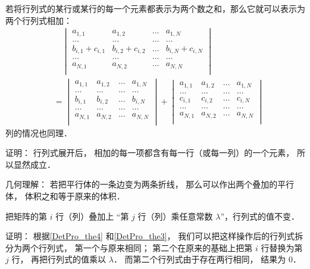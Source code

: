 \begin{theorem}{}\label{DetPro_the4}
若将行列式的某行或某行的每一个元素都表示为两个数之和，那么它就可以表示为两个行列式相加：
\begin{equation}\label{DetPro_eq1}
\begin{aligned}
&\quad\begin{vmatrix}
a_{1,1} & a_{1,2} & \dots & a_{1,N}\\
\dots & \dots & \dots & \dots\\
b_{i,1} + c_{i,1} & b_{i, 2} + c_{i, 2} & \dots & b_{i,N} + c_{i,N}\\
\dots & \dots & \dots & \dots\\
a_{N,1} & a_{N,2} & \dots & a_{N,N}\\
\end{vmatrix}\\
&=
\begin{vmatrix}
a_{1,1} & a_{1,2} & \dots & a_{1,N}\\
\dots & \dots & \dots & \dots\\
b_{i,1} & b_{i, 2} & \dots & b_{i,N}\\
\dots & \dots & \dots & \dots\\
a_{N,1} & a_{N,2} & \dots & a_{N,N}\\
\end{vmatrix}
+
\begin{vmatrix}
a_{1,1} & a_{1,2} & \dots & a_{1,N}\\
\dots & \dots & \dots & \dots\\
c_{i,1} & c_{i, 2} & \dots & c_{i,N}\\
\dots & \dots & \dots & \dots\\
a_{N,1} & a_{N,2} & \dots & a_{N,N}\\
\end{vmatrix}
\end{aligned}
\end{equation}
列的情况也同理．
\end{theorem}
证明： 行列式展开后， 相加的每一项都含有每一行（或每一列）的一个元素， 所以显然成立．

几何理解： 若把平行体的一条边变为两条折线， 那么可以作出两个叠加的平行体， 体积之和等于原来的体积．

\begin{theorem}{ }\label{DetPro_the5}
把矩阵的第 $i$ 行（列）叠加上 “第 $j$ 行（列）乘任意常数 $\lambda$”，行列式的值不变．
\end{theorem}
证明： 根据\autoref{DetPro_the4} 和\autoref{DetPro_the3}， 我们可以把这样操作后的行列式拆分为两个行列式， 第一个与原来相同； 第二个在原来的基础上把第 $i$ 行替换为第 $j$ 行， 再把行列式的值乘以 $\lambda$． 而第二个行列式由于存在两行相同， 结果为 0．

